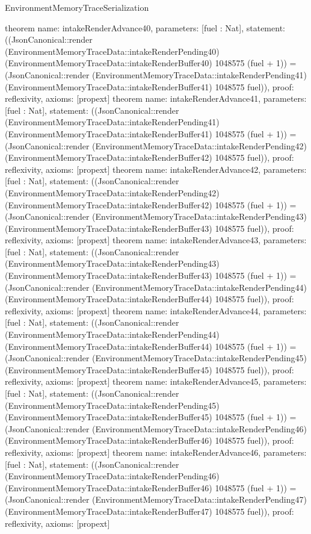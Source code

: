 \begin{lexlean}{EnvironmentMemoryTraceSerialization}
\begin{semanticmodule}
{}
theorem{
 name: intakeRenderAdvance40, parameters: [fuel : Nat],
 statement: ((JsonCanonical::render (EnvironmentMemoryTraceData::intakeRenderPending40) (EnvironmentMemoryTraceData::intakeRenderBuffer40) 1048575 (fuel + 1)) = (JsonCanonical::render (EnvironmentMemoryTraceData::intakeRenderPending41) (EnvironmentMemoryTraceData::intakeRenderBuffer41) 1048575 fuel)), proof: reflexivity{}, axioms: [propext]
}
theorem{
 name: intakeRenderAdvance41, parameters: [fuel : Nat],
 statement: ((JsonCanonical::render (EnvironmentMemoryTraceData::intakeRenderPending41) (EnvironmentMemoryTraceData::intakeRenderBuffer41) 1048575 (fuel + 1)) = (JsonCanonical::render (EnvironmentMemoryTraceData::intakeRenderPending42) (EnvironmentMemoryTraceData::intakeRenderBuffer42) 1048575 fuel)), proof: reflexivity{}, axioms: [propext]
}
theorem{
 name: intakeRenderAdvance42, parameters: [fuel : Nat],
 statement: ((JsonCanonical::render (EnvironmentMemoryTraceData::intakeRenderPending42) (EnvironmentMemoryTraceData::intakeRenderBuffer42) 1048575 (fuel + 1)) = (JsonCanonical::render (EnvironmentMemoryTraceData::intakeRenderPending43) (EnvironmentMemoryTraceData::intakeRenderBuffer43) 1048575 fuel)), proof: reflexivity{}, axioms: [propext]
}
theorem{
 name: intakeRenderAdvance43, parameters: [fuel : Nat],
 statement: ((JsonCanonical::render (EnvironmentMemoryTraceData::intakeRenderPending43) (EnvironmentMemoryTraceData::intakeRenderBuffer43) 1048575 (fuel + 1)) = (JsonCanonical::render (EnvironmentMemoryTraceData::intakeRenderPending44) (EnvironmentMemoryTraceData::intakeRenderBuffer44) 1048575 fuel)), proof: reflexivity{}, axioms: [propext]
}
theorem{
 name: intakeRenderAdvance44, parameters: [fuel : Nat],
 statement: ((JsonCanonical::render (EnvironmentMemoryTraceData::intakeRenderPending44) (EnvironmentMemoryTraceData::intakeRenderBuffer44) 1048575 (fuel + 1)) = (JsonCanonical::render (EnvironmentMemoryTraceData::intakeRenderPending45) (EnvironmentMemoryTraceData::intakeRenderBuffer45) 1048575 fuel)), proof: reflexivity{}, axioms: [propext]
}
theorem{
 name: intakeRenderAdvance45, parameters: [fuel : Nat],
 statement: ((JsonCanonical::render (EnvironmentMemoryTraceData::intakeRenderPending45) (EnvironmentMemoryTraceData::intakeRenderBuffer45) 1048575 (fuel + 1)) = (JsonCanonical::render (EnvironmentMemoryTraceData::intakeRenderPending46) (EnvironmentMemoryTraceData::intakeRenderBuffer46) 1048575 fuel)), proof: reflexivity{}, axioms: [propext]
}
theorem{
 name: intakeRenderAdvance46, parameters: [fuel : Nat],
 statement: ((JsonCanonical::render (EnvironmentMemoryTraceData::intakeRenderPending46) (EnvironmentMemoryTraceData::intakeRenderBuffer46) 1048575 (fuel + 1)) = (JsonCanonical::render (EnvironmentMemoryTraceData::intakeRenderPending47) (EnvironmentMemoryTraceData::intakeRenderBuffer47) 1048575 fuel)), proof: reflexivity{}, axioms: [propext]
}
\end{semanticmodule}
\end{lexlean}
